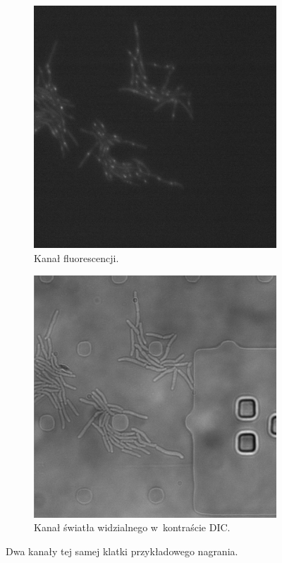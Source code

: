 \documentclass[declaration,shortabstract,mgr]{iithesis}
\begin{document}
\begin{figure}[h]
  \centering

  \begin{subfigure}[t]{.45\textwidth}
    \centering
    \includegraphics[width=\textwidth]{images/input-channel-1.png}
    \caption{\centering Kanał fluorescencji.}
  \end{subfigure}
  \hfill
  \begin{subfigure}[t]{.45\textwidth}
    \centering
    \includegraphics[width=\textwidth]{images/input-channel-2.png}
    \caption{\centering Kanał światła widzialnego w~kontraście DIC.}
  \end{subfigure}
  \hfill

  \caption{Dwa kanały tej samej klatki przykładowego nagrania.}
  \label{fig:input-images}
\end{figure}
\end{document}
